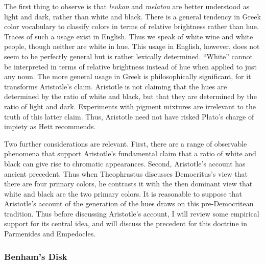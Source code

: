 The first thing to observe is that \emph{leukon} and \emph{melaton} are better understood as light and dark, rather than white and black. There is a general tendency in Greek color vocabulary to classify colors in terms of relative brightness rather than hue. Traces of such a usage exist in English. Thus we speak of white wine and white people, though neither are white in hue. This usage in English, however, does not seem to be perfectly general but is rather lexically determined. ``White'' cannot be interpreted in terms of relative brightness instead of hue when applied to just any noun. The more general usage in Greek is philosophically significant, for it transforms Aristotle's claim. Aristotle is not claiming that the hues are determined by the ratio of white and black, but that they are determined by the ratio of light and dark. Experiments with pigment mixtures are irrelevant to the truth of this latter claim. Thus, Aristotle need not have risked Plato's charge of impiety as Hett recommends. 

Two further considerations are relevant. First, there are a range of observable phenomena that support Aristotle's fundamental claim that a ratio of white and black can give rise to chromatic appearances. Second, Aristotle's account has ancient precedent. Thus when Theophrastus discusses Democritus's view that there are four primary colors, he contrasts it with the then dominant view that white and black are the two primary colors. It is reasonable to suppose that Aristotle's account of the generation of the hues draws on this pre-Democritean tradition. Thus before discussing Aristotle's account, I will review some empirical support for its central idea, and will discuss the precedent for this doctrine in Parmenides and Empedocles. \change

\begin{frame}[t]\frametitle{Benham's Disk}
	\begin{center}
	\end{center}
\end{frame}

